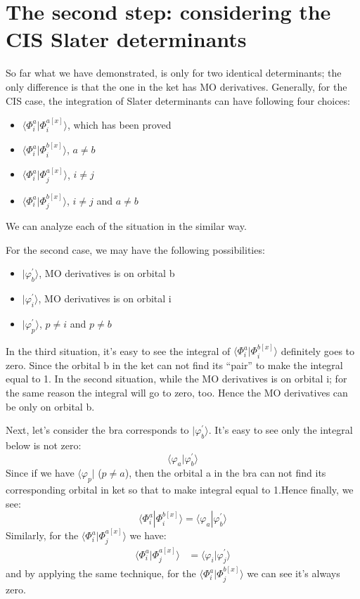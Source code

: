 \documentclass[a4paper,12pt]{article}
\newcommand{\bra}[1]{\langle #1| }
\newcommand{\ket}[1]{|#1 \rangle }
\theoremstyle{definition}\newtheorem{law}{Law}
\theoremstyle{plain}\newtheorem{theorem}{Theorem}
\theoremstyle{remark}\newtheorem{remark}{Remark}
\theoremstyle{axiom}\newtheorem{axiom}{Axiom}
\begin{document}
\section{The second step: considering the CIS Slater determinants}
%
%
%
%
So far what we have demonstrated, is only for two identical determinants; the
only difference is that the one in the ket has MO derivatives. 
Generally, for the CIS case, the integration of Slater determinants can have
following four
choices:
\begin{itemize}
\item $\langle\Phi^{a}_{i}|\Phi^{a[x]}_{i}\rangle$, which has been proved
\item $\langle\Phi^{a}_{i}|\Phi^{b[x]}_{i}\rangle$, $a \neq b$
\item $\langle\Phi^{a}_{i}|\Phi^{a[x]}_{j}\rangle$, $i \neq j$
\item $\langle\Phi^{a}_{i}|\Phi^{b[x]}_{j}\rangle$, $i \neq j$ and $a \neq
b$
\end{itemize}
We can analyze each of the situation in the similar way.

For the second case, we may have the following possibilities:
 \begin{itemize}
 \item $\ket{\varphi_{b}^{'}}$, MO derivatives is on orbital b 
 \item $\ket{\varphi_{i}^{'}}$, MO derivatives is on orbital i 
 \item $\ket{\varphi_{p}^{'}}$, $p \neq i$ and $p \neq b$
\end{itemize} 
In the third situation, it's easy to see the integral of
$\langle\Phi^{a}_{i}|\Phi^{b[x]}_{i}\rangle$ definitely goes to
zero. Since the orbital b in the ket can not find its ``pair'' to make the
integral equal to 1. In the second situation,  while the MO derivatives is on
orbital i; for the same reason the integral will go to zero, too. Hence the MO
derivatives can be only on orbital b.

Next, let's consider the bra corresponds to $\ket{\varphi_{b}^{'}}$. It's easy
to see only the integral below is not zero:
\begin{equation}
 \label{eq:10}
\langle\varphi_{a}|\varphi_{b}^{'}\rangle
\end{equation}
Since if we have $\bra{\varphi_{p}}$ ($p \neq a$), then the orbital a in the
bra can not find its corresponding orbital in ket so that to make integral
equal to 1.Hence finally, we see:
\begin{equation}
\label{eq:11}
 \langle\Phi^{a}_{i}|\Phi^{b[x]}_{i}\rangle =
\langle\varphi_{a}|\varphi_{b}^{'}\rangle
\end{equation}
Similarly, for the $\langle\Phi^{a}_{i}|\Phi^{a[x]}_{j}\rangle$ we have:
\begin{align}
\label{eq:12}
 \langle\Phi^{a}_{i}|\Phi^{a[x]}_{j}\rangle &=
\langle\varphi_{i}|\varphi_{j}^{'}\rangle 
\end{align}
and by applying the same technique, for the
$\langle\Phi^{a}_{i}|\Phi^{b[x]}_{j}\rangle$ we can see it's always zero. 
\end{document}
